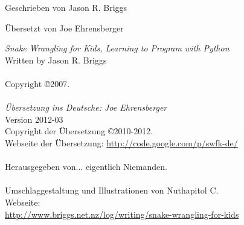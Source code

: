 \begin{flushright}
\textcolor{bleu}{\begin{Huge}\textsf{Geschrieben von Jason R. Briggs}\end{Huge}}

\textcolor{bleu}{\begin{huge}\textsf{Übersetzt von Joe Ehrensberger}\end{huge}}
\end{flushright}

\newpage

\noindent
\textsf{\emph{Snake Wrangling for Kids, Learning to Program with Python}}\\
Written by Jason R. Briggs\\
\\
Copyright \copyright 2007.\\
\\
\textsf{\emph{Übersetzung ins Deutsche: Joe Ehrensberger}}\\
Version 2012-03
\\
Copyright der Übersetzung \copyright 2010-2012.\\
Webseite der Übersetzung: \href{http://code.google.com/p/swfk-de/}{http://code.google.com/p/swfk-de/}\\
\\
Herausgegeben von... eigentlich Niemanden.\\
\\
Umschlaggestaltung und Illustrationen von Nuthapitol C.\\
\linebreak 
\noindent
Webseite:\\ \href{http://www.briggs.net.nz/log/writing/snake-wrangling-for-kids}{http://www.briggs.net.nz/log/writing/snake-wrangling-for-kids}\\ 

